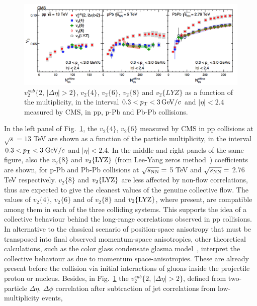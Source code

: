 \begin{figure}[!ht]
  \centering
  \includegraphics[width=15cm]{FigCap1/v2CumulantsCMS.png}
  \caption{$v_2^{sub} \{2,\, |\Delta \eta| > 2\}$, $v_2 \{4\}$, $v_2 \{6\}$, $v_2 \{8\}$ 
  and $v_2 \{LYZ\}$ as a function of the multiplicity, 
  in the interval $0.3 < p_{\rm T} < 3\, \mathrm{GeV}/c$ and $|\eta| < 2.4$~\cite{Khachatryan:2016txc} measured by CMS, in pp, p-Pb and Pb-Pb collisions.}
  \label{fig:CumulantsCMS}
\end{figure}
In the left panel of Fig.~\ref{fig:CumulantsCMS}, the $v_2 \{4\}$, $v_2 \{6\}$
measured by CMS in pp collisions at $\sqrt{s} = 13$ TeV are shown as a 
function of the particle multiplicity, in the interval $0.3 < p_{\rm T} < 3 \; \mathrm{GeV}/c$ and 
$|\eta| < 2.4$. In the middle and right panels of the same figure, also the $v_2 \{8\}$ and $v_2 \{ {\rm LYZ} \}$ 
(from Lee-Yang zeros method~\cite{Bhalerao:2003yq}) coefficients are shown, for p-Pb and Pb-Pb collisions
at $\sqrt{s_{\rm NN}} = $ 5 TeV and $\sqrt{s_{\rm NN}} = $ 2.76 TeV respectively.
$v_2 \{8\}$ and $v_2 \{ {\rm LYZ} \}$ are less affected by non-flow correlations, 
thus are expected to give the 
cleanest values of the genuine collective flow.
The values of $v_2 \{4\}$, $v_2 \{6\}$ and of $v_2 \{8\}$ and  $v_2 \{ {\rm LYZ} \}$, where present, are compatible among 
them in each of the three colliding systems. This supports the idea 
of a collective behaviour behind the long-range correlations observed in pp 
collisions. In alternative to the classical scenario of position-space
anisotropy that must be transposed into final observed momentum-space anisotropies, other theoretical 
calculations, such as the color glass condensate glasma model~\cite{Schenke:2016ksl}, 
interpret the collective behaviour as due to momentum space-anisotropies. These are
already present before the collision via initial interactions of gluons inside the projectile proton or
nucleus. Besides, in Fig.~\ref{fig:CumulantsCMS} the 
$v_2^{sub} \{2$, $|\Delta \eta| > 2\}$, defined from two-particle 
$\Delta \eta$, $\Delta \phi$ correlation after subtraction of jet correlations from low-multiplicity events, 
